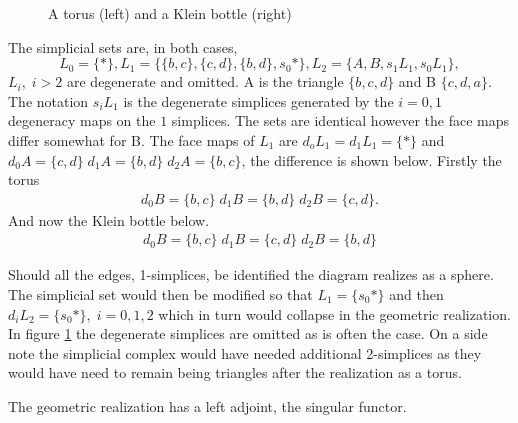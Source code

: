 \documentclass[../../main.tex]{subfiles}
\begin{document}
\begin{example}
\begin{figure}[H]
\begin{subfigure}[b]{0.3\textwidth}
        \end{subfigure}
        \caption{A torus (left) and a Klein bottle (right)}
        \label{fig:squares}
        \end{figure}
        The simplicial sets are, in both cases, 
        \[L_0=\{*\}, L_1=\{\{b,c\},\{c,d\},\{b,d\},s_0*\}, L_2=\{A,B,s_1L_1,s_0L_1\},\] $L_i,\; i>2$ are degenerate and omitted. A is the triangle $\{b,c,d\}$ and B $\{c,d,a\}$. The notation $s_iL_1$ is the degenerate simplices generated by the $i=0,1$ degeneracy maps on the $1$ simplices. The sets are identical however the face maps differ somewhat for B. The face maps of $L_1$ are $d_oL_1=d_1L_1=\{*\}$ and $d_0A=\{c,d\} \; d_1A = \{b,d\} \; d_2A=\{b,c\}$, the difference is shown below. Firstly the torus 
        \begin{align*}
            d_0B=\{b,c\} \; d_1B = \{b,d\} \; d_2B=\{c,d\}.
        \end{align*}
        And now the Klein bottle below.
        \begin{align*}
            d_0B=\{b,c\} \; d_1B = \{c,d\} \; d_2B=\{b,d\}
        \end{align*}

        Should all the edges, 1-simplices, be identified the diagram realizes as a sphere. The simplicial set would then be modified so that $L_1=\{s_0*\}$ and then $d_iL_2=\{s_0*\},\; i=0,1,2$ which in turn would collapse in the geometric realization. In figure \ref{fig:squares} the degenerate simplices are omitted as is often the case. On a side note the simplicial complex would have needed additional 2-simplices as they would have need to remain being triangles after the realization as a torus.
    \end{example}

    The geometric realization has a left adjoint, the singular functor. 
\end{document}
